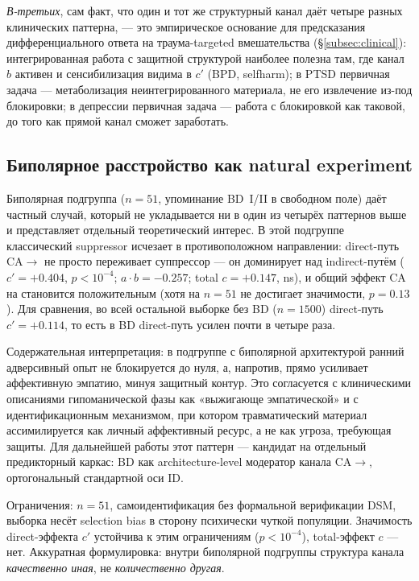 \emph{В-третьих}, сам факт, что один и тот же структурный канал даёт четыре разных клинических паттерна, --- это эмпирическое основание для предсказания дифференциального ответа на траума-targeted вмешательства (§\ref{subsec:clinical}): интегрированная работа с защитной структурой наиболее полезна там, где канал $b$ активен и сенсибилизация видима в $c'$ (BPD, selfharm); в PTSD первичная задача --- метаболизация неинтегрированного материала, не его извлечение из-под блокировки; в депрессии первичная задача --- работа с блокировкой как таковой, до того как прямой канал сможет заработать.

\subsection{Биполярное расстройство как natural experiment}
\label{subsec:bipolar_experiment}

Биполярная подгруппа ($n=51$, упоминание BD~I/II в свободном поле) даёт частный случай, который не укладывается ни в один из четырёх паттернов выше и представляет отдельный теоретический интерес. В этой подгруппе классический suppressor исчезает в противоположном направлении: direct-путь CA$\to$\EAF{} не просто переживает суппрессор --- он доминирует над indirect-путём ($c' = +0.404$, $p < 10^{-4}$; $a \cdot b = -0.257$; total $c = +0.147$, ns), и общий эффект CA на \EAF{} становится положительным (хотя на $n=51$ не достигает значимости, $p = 0.13$). Для сравнения, во всей остальной выборке без BD ($n=1500$) direct-путь $c' = +0.114$, то есть в BD direct-путь усилен почти в четыре раза.

Содержательная интерпретация: в подгруппе с биполярной архитектурой ранний адверсивный опыт не блокируется до нуля, а, напротив, прямо усиливает аффективную эмпатию, минуя защитный контур. Это согласуется с клиническими описаниями гипоманической фазы как «выжигающе эмпатической» и с идентификационным механизмом, при котором травматический материал ассимилируется как личный аффективный ресурс, а не как угроза, требующая защиты. Для дальнейшей работы этот паттерн --- кандидат на отдельный предикторный каркас: BD как architecture-level модератор канала CA$\to$\EAF{}, ортогональный стандартной оси ID.

Ограничения: $n=51$, самоидентификация без формальной верификации DSM, выборка несёт selection bias в сторону психически чуткой популяции. Значимость direct-эффекта $c'$ устойчива к этим ограничениям ($p < 10^{-4}$), total-эффект $c$ --- нет. Аккуратная формулировка: внутри биполярной подгруппы структура канала \emph{качественно иная}, не \emph{количественно другая}.

